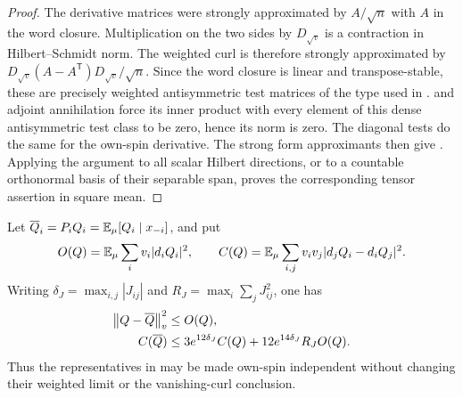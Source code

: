 \begin{proof}
The derivative matrices were strongly approximated by $A/\sqrt n$
with $A$ in the word closure.  Multiplication on the two sides by
$D_{\sqrt v}$ is a contraction in Hilbert--Schmidt norm.  The weighted
curl is therefore strongly approximated by
$D_{\sqrt v}(A-A^{\mathsf T})D_{\sqrt v}/\sqrt n$.
Since the word closure is linear and transpose-stable, these are
precisely weighted antisymmetric test matrices of the type used in
.
 and adjoint annihilation force its inner
product with every element of this dense antisymmetric test class to be
zero, hence its norm is zero.  The diagonal tests do the same for the
own-spin derivative.  The strong form approximants then give
.  Applying the argument to all scalar
Hilbert directions, or to a countable orthonormal basis of their
separable span, proves the corresponding tensor assertion in square
mean.
\end{proof}

\begin{lemma}\label{lem:exact-own-spin}
Let $\overline Q_i=P_iQ_i=\mathbb E_\mu[Q_i\mid x_{-i}]$, and put
\[
 O(Q)=\mathbb E_\mu\sum_i v_i|d_iQ_i|^2,\qquad
 C(Q)=\mathbb E_\mu\sum_{i,j}v_iv_j|d_jQ_i-d_iQ_j|^2.
\]
Writing $\delta_J=\max_{i,j}|J_{ij}|$ and
$R_J=\max_i\sum_jJ_{ij}^2$, one has
\begin{align}\label{eq:exact-own-spin-bound}
 \left\lVert Q-\overline Q\right\rVert_v^2&\le O(Q),\notag\\
 C(\overline Q)&\le3e^{12\delta_J}C(Q)
                    +12e^{14\delta_J}R_JO(Q).
\end{align}
Thus the representatives in  may be made
own-spin independent without changing their weighted limit or the
vanishing-curl conclusion.
\end{lemma}


